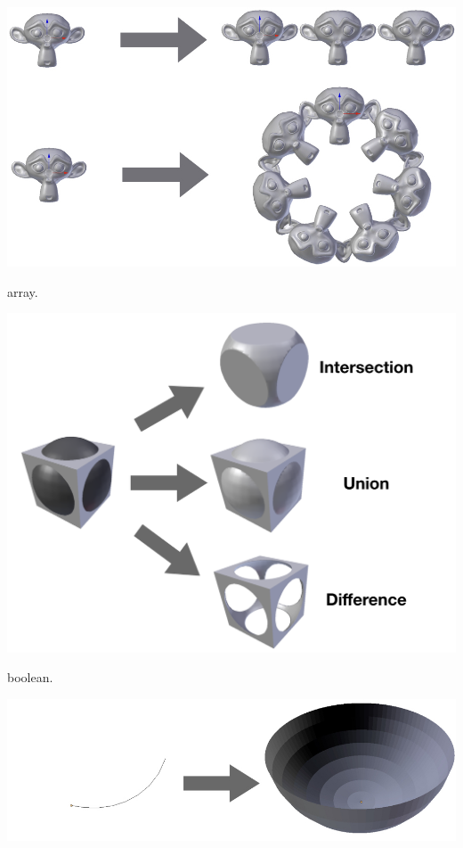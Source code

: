 \begin{figureth}
	\begin{subfigureth}{0.45\textwidth}
		\includegraphics[width=\linewidth]{images/array}
		\caption{\gls{array}.}
		\hfill
		\qquad
	\end{subfigureth}
	\qquad
	\begin{subfigureth}{0.45\textwidth}
		\includegraphics[width=\linewidth]{images/boolean}
		\caption{\gls{boolean}.}
		\qquad
	\end{subfigureth} 
	\begin{subfigureth}{0.45\textwidth}
		\includegraphics[width=\linewidth]{images/screw}

\end{subfigureth}
\end{figureth}
